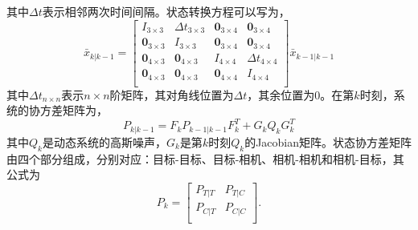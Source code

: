 其中$\Delta t$表示相邻两次时间间隔。状态转换方程可以写为，
\begin{equation}
\bar{x}_{k|k-1}=\left[\begin{matrix}
I_{3\times 3} & \Delta t_{3\times 3} & \textbf{0}_{3\times 4} & \textbf{0}_{3\times 4}\\
\textbf{0}_{3\times 3} & I_{3\times 3} & \textbf{0}_{3\times 4} & \textbf{0}_{3\times 4}\\
\textbf{0}_{4\times 3} & \textbf{0}_{4\times 3} & I_{4\times 4} & \Delta t_{4\times 4}\\
\textbf{0}_{4\times 3} & \textbf{0}_{4\times 3} & \textbf{0}_{4\times 4} & I_{4\times 4}\\
\end{matrix}\right]\bar{x}_{k-1|k-1}
\end{equation}
其中$\Delta t_{n \times n}$表示$n \times n$阶矩阵，其对角线位置为$\Delta t$，其余位置为0。在第$k$时刻，系统的协方差矩阵为，
\begin{equation}
P_{k|k-1}=F_kP_{k-1|k-1}F^T_k+G_kQ_kG^T_k
\end{equation}
其中$Q_k$是动态系统的高斯噪声，$G_k$是第$k$时刻$Q_k$的Jacobian矩阵。状态协方差矩阵由四个部分组成，分别对应：目标-目标、目标-相机、相机-相机和相机-目标，其公式为
\begin{equation}
P_k=\left[
\begin{matrix}
P_{T|T} & P_{T|C} \\
P_{C|T} & P_{C|C} \\
\end{matrix}\right].
\end{equation}


